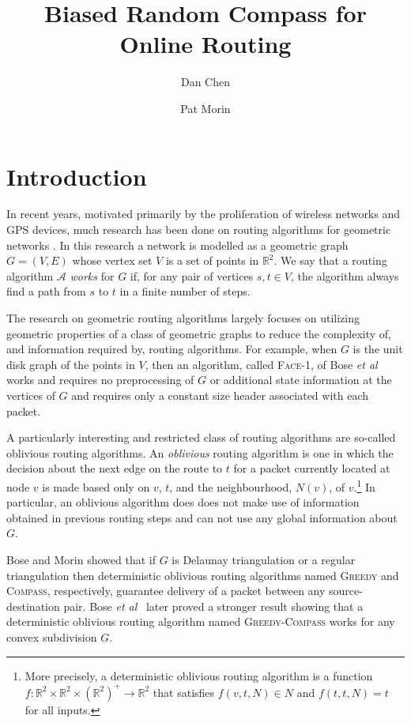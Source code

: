 \documentclass [letterpaper] {article}
\title{Biased Random Compass for Online Routing}
\author{Dan Chen \and Pat Morin}
\newcommand{\R}{\mathbb{R}}
\newcommand{\etal}{\emph{et al}}
\begin{document}
\maketitle

\section{Introduction}
\label{sec:intro}

In recent years, motivated primarily by the proliferation of wireless networks and GPS devices, much research has been done on routing algorithms for geometric networks \cite{gior03}.  In this research a network is modelled as a geometric graph $G=(V,E)$ whose vertex set $V$ is a set of points in $\R^2$. We say that a routing algorithm $\mathcal{A}$ \emph{works} for $G$ if, for any pair of vertices $s,t\in V$, the algorithm always find a path from $s$ to $t$ in a finite number of steps.

The research on geometric routing algorithms largely focuses on utilizing geometric properties of a class of geometric graphs to reduce the complexity of, and information required by, routing algorithms.  For example, when $G$ is the unit disk graph of the points in $V$, then an algorithm, called \textsc{Face-1}, of Bose \etal\ \cite{bose01} works and requires no preprocessing of $G$ or additional state information at the vertices of $G$ and requires only a constant size header associated with each packet.

A particularly interesting and restricted class of routing algorithms are so-called oblivious routing algorithms.  An \emph{oblivious} routing algorithm is one in which the decision about the next edge on the route to $t$ for a packet currently located at node $v$ is made based only on $v$, $t$, and the neighbourhood, $N(v)$, of $v$.\footnote{More precisely, a deterministic oblivious routing algorithm is a function $f:\R^2\times\R^2\times(\R^2)^+\rightarrow \R^2$ that satisfies $f(v,t,N) \in N$ and $f(t,t,N) = t$ for all inputs.}  In particular, an oblivious algorithm does does not make use of information obtained in previous routing steps and can not use any global information about $G$.

Bose and Morin \cite{bose04} showed that if $G$ is Delaunay triangulation or a regular triangulation then deterministic oblivious routing algorithms named \textsc{Greedy} and \textsc{Compass}, respectively, guarantee delivery of a packet between any source-destination pair.  Bose \etal\ \cite{bose02} later proved a stronger result showing that a deterministic oblivious routing algorithm named \textsc{Greedy-Compass} works for any convex subdivision $G$.
\end{document}
